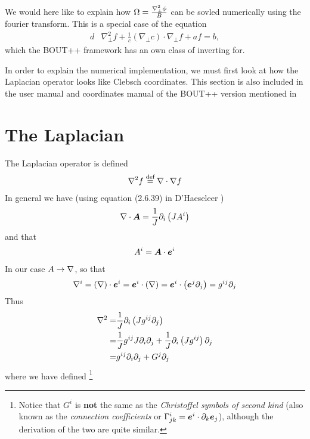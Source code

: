 We would here like to explain how $\Omega = \frac{\nabla_\perp^2\phi}{B}$ can be sovled numerically using the fourier transform.
This is a special case of the equation
%
\begin{align}
    d&\nabla_\perp^2f + \frac{1}{c}(\nabla_\perp c)\cdot\nabla_\perp f + af = b,
\label{eq:to_invert_tri}
\end{align}
%
which the BOUT++ framework has an own class of inverting for.

In order to explain the numerical implementation, we must first look at how the Laplacian operator looks like Clebsch coordinates.
This section is also included in the user manual and coordinates manual of the BOUT++ version mentioned in

\section{The Laplacian}
%
The Laplacian operator is defined
%
\begin{align*}
    \nabla^2f \overset{\text{def}}{=} \nabla\cdot \nabla f
\end{align*}
%
In general we have (using equation (2.6.39) in D'Haeseleer \cite{Dhaeseleer1991book})
%
\begin{align}
    \nabla\cdot \boldsymbol{A} = \frac{1}{J} \partial_i \left(JA^i\right)
    \label{eq:divA}
\end{align}
%
and that
%
\begin{align*}
    A^i = \boldsymbol{A}\cdot \boldsymbol{e}^i
\end{align*}
%
In our case $A \to \nabla$, so that
%
\begin{align*}
    \nabla^i = \left(\nabla\right)\cdot \boldsymbol{e}^i = \boldsymbol{e}^i \cdot \left(\nabla\right) = \boldsymbol{e}^i
    \cdot \left(\boldsymbol{e}^j \partial_j\right) = g^{ij} \partial_j
\end{align*}
%
Thus
%
\begin{align*}
    \nabla^2 =& \frac{1}{J} \partial_i \left(J g^{ij} \partial_j\right)\\ =&
    \frac{1}{J} g^{ij} J \partial_i \partial_j + \frac{1}{J} \partial_i \left(J
    g^{ij} \right) \partial_j\\ =& g^{ij} \partial_i \partial_j + G^j \partial_j\\
\end{align*}
%
where we have defined
%
\footnote{Notice that $G^i$ is \textbf{not} the same as the \emph{Christoffel symbols of second kind} (also known as the \emph{connection coefficients} or $\Gamma^i_{jk}=\boldsymbol{e}^i\cdot\partial_k \boldsymbol{e}_j$), although the derivation of the two are quite similar.}
